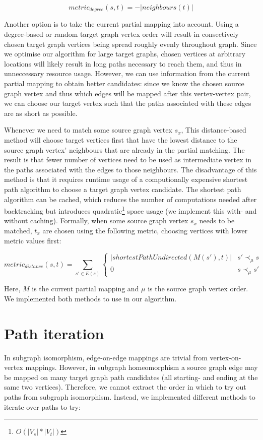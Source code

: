 $$\mathit{metric}_\mathit{degree}(s, t)=-|\mathit{neighbours}(t)|$$

Another option is to take the current partial mapping into account. Using a degree-based or random target graph vertex order will result in consectively chosen target graph vertices being spread roughly evenly throughout graph. Since we optimise our algorithm for large target graphs, chosen vertices at arbitrary locations will likely result in long paths necessary to reach them, and thus in unneccessary resource usage. However, we can use information from the current partial mapping to obtain better candidates: since we know the chosen source graph vertex and thus which edges will be mapped after this vertex-vertex pair, we can choose our target vertex such that the paths associated with these edges are as short as possible.

Whenever we need to match some source graph vertex $s_x$, This distance-based method will choose target vertices first that have the lowest distance to the source graph vertex' neighbours that are already in the partial matching. The result is that fewer number of vertices need to be used as intermediate vertex in the paths associated with the edges to those neighbours. The disadvantage of this method is that it requires runtime usage of a computionally expensive shortest path algorithm to choose a target graph vertex candidate. The shortest path algorithm can be cached, which reduces the number of computations needed after backtracking but introduces quadratic\footnote{$O(|V_s|*|V_t|)$} space usage (we implement this with- and without caching). Formally, when some source graph vertex $s_x$ needs to be matched, $t_x$ are chosen using the following metric, choosing vertices with lower metric values first:


$$\mathit{metric}_\mathit{distance}(s, t)=\sum_{s' \in E(s)} \begin{cases}
|\mathit{shortestPathUndirected}(M(s'), t)| & s' \prec_\mu s\\
0 & s \prec_\mu s'
\end{cases}$$

Here, $M$ is the current partial mapping and $\mu$ is the source graph vertex order. We implemented both methods to use in our algorithm.

\section{Path iteration}
\label{sec:pathIteration}
In subgraph isomorphism, edge-on-edge mappings are trivial from vertex-on-vertex mappings. However, in subgraph homeomorphism a source graph edge may be mapped on many target graph path candidates (all starting- and ending at the same two vertices). Therefore, we cannot extract the order in which to try out paths from subgraph isomorphism. Instead, we implemented different methods to iterate over paths to try:

